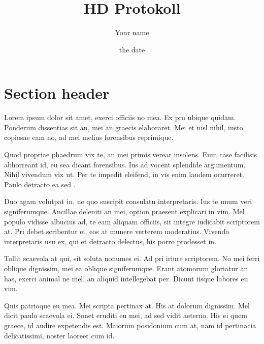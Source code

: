 \documentclass[%
 12pt, %
 english, %
 a4paper, %
 DIV14, %
 twoside,
]{hdprotokoll}%
\title{HD Protokoll}
\author{Your name}
\date{the date} %
\institute{free text}
\begin{document}
\maketitle
\cleardoublepage

\tableofcontents
\cleardoublepage 
{}


\section{Section header}
Lorem ipsum dolor sit amet, exerci officiis no mea. Ex pro ubique quidam. Ponderum dissentias sit an, mei an graecis elaboraret. Mei et nisl nihil, iusto copiosae eam no, ad mei melius forensibus reprimique.

Quod propriae phaedrum vix te, an mei primis verear insolens. Eum case facilisis abhorreant id, eu sea dicant forensibus. Ius ad vocent splendide argumentum. Nihil vivendum vix ut. Per te impedit eleifend, in vis enim laudem ocurreret. Paulo detracto ea sed \cite{hector1999plant}.

Duo agam volutpat in, ne quo suscipit consulatu interpretaris. Ius te unum veri signiferumque. Ancillae deleniti an mei, option praesent explicari in vim. Mel populo vidisse albucius ad, te eam aliquam officiis, sit integre iudicabit scriptorem at. Pri debet scribentur ei, eos at munere verterem moderatius. Vivendo interpretaris usu ex, qui et detracto delectus, his porro prodesset in.

Tollit scaevola at qui, sit soluta nonumes ei. Ad pri iriure scriptorem. No mei ferri oblique dignissim, mei ea oblique signiferumque. Erant atomorum gloriatur an has, exerci animal ne mel, an aliquid intellegebat per. Dicunt iisque labores eu vim.

Quis patrioque eu mea. Mei scripta pertinax at. His at dolorum dignissim. Mel dicit paulo scaevola ei. Sonet eruditi eu mei, ad sed vidit aeterno. His ei quem graece, id audire expetendis est. Maiorum posidonium cum at, nam id pertinacia delicatissimi, noster laoreet cum id.

\printbibliography
\end{document}
